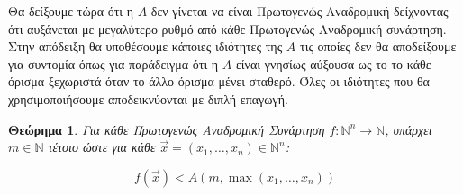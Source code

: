 \documentclass[a4paper, oneside, 11pt]{article}
\newtheorem{thm}{Θεώρημα}
\theoremstyle{definition}
\newcommand{\ora}{\vec}
\begin{document}
Θα δείξουμε τώρα ότι η $A$ δεν γίνεται να είναι Πρωτογενώς Αναδρομική δείχνοντας
ότι αυξάνεται με μεγαλύτερο ρυθμό από κάθε Πρωτογενώς Αναδρομική συνάρτηση.
Στην απόδειξη θα υποθέσουμε κάποιες ιδιότητες της $A$ τις οποίες δεν θα
αποδείξουμε για συντομία όπως για παράδειγμα ότι η $A$ είναι γνησίως αύξουσα
ως το το κάθε όρισμα ξεχωριστά όταν το άλλο όρισμα μένει σταθερό. Όλες οι
ιδιότητες που θα χρησιμοποιήσουμε αποδεικνύονται με διπλή επαγωγή.

\begin{thm}
\label{thm5}
Για κάθε Πρωτογενώς Αναδρομική Συνάρτηση $f : \mathbb{N}^n \rightarrow
\mathbb{N}$, υπάρχει $m \in \mathbb{N}$ τέτοιο
ώστε για κάθε $\ora{x} = (x_1, \ldots, x_n) \in \mathbb{N}^n$:

\[ f(\ora{x}) < A(m, \max(x_1, \ldots, x_n) ) \]
\end{thm}
\end{document}
